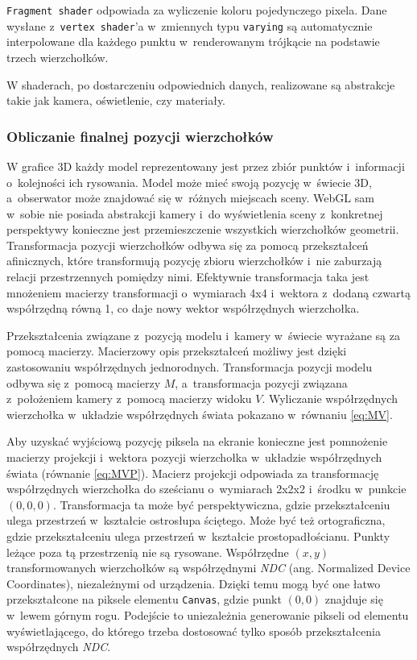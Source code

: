 \texttt{Fragment shader} odpowiada za wyliczenie koloru pojedynczego pixela. Dane wysłane z~\texttt{vertex shader}'a w~zmiennych typu \texttt{varying} są automatycznie interpolowane dla każdego punktu w~renderowanym trójkącie na podstawie trzech wierzchołków.

W shaderach, po dostarczeniu odpowiednich danych, realizowane są abstrakcje takie jak kamera, oświetlenie, czy materiały.

\subsubsection{Obliczanie finalnej pozycji wierzchołków}

W grafice 3D każdy model reprezentowany jest przez zbiór punktów i~informacji o~kolejności ich rysowania. Model może mieć swoją pozycję w~świecie 3D, a~obserwator może znajdować się w~różnych miejscach sceny. WebGL sam w~sobie nie posiada abstrakcji kamery i~do wyświetlenia sceny z~konkretnej perspektywy konieczne jest przemieszczenie wszystkich wierzchołków geometrii. Transformacja pozycji wierzchołków odbywa się za pomocą przekształceń afinicznych, które transformują pozycję zbioru wierzchołków i~nie zaburzają relacji przestrzennych pomiędzy nimi. Efektywnie transformacja taka jest mnożeniem macierzy transformacji o~wymiarach 4x4 i~wektora z~dodaną czwartą współrzędną równą 1, co daje nowy wektor współrzędnych wierzchołka.

Przekształcenia związane z~pozycją modelu i~kamery w~świecie wyrażane są za pomocą macierzy. Macierzowy opis przekształceń możliwy jest dzięki zastosowaniu współrzędnych jednorodnych\cite{Homogeneous}. Transformacja pozycji modelu odbywa się z~pomocą macierzy $M$, a~transformacja pozycji związana z~położeniem kamery z~pomocą macierzy widoku $V$. Wyliczanie współrzędnych wierzchołka w~układzie współrzędnych świata pokazano w~równaniu \ref{eq:MV}.

Aby uzyskać wyjściową pozycję piksela na ekranie konieczne jest pomnożenie macierzy projekcji i~wektora pozycji wierzchołka w~układzie współrzędnych świata (równanie \ref{eq:MVP}). Macierz projekcji odpowiada za transformację współrzędnych wierzchołka do sześcianu o~wymiarach 2x2x2 i~środku w~punkcie $(0, 0, 0)$. Transformacja ta może być perspektywiczna, gdzie przekształceniu ulega przestrzeń w~kształcie ostrosłupa ściętego. Może być też ortograficzna, gdzie przekształceniu ulega przestrzeń w~kształcie prostopadłościanu. Punkty leżące poza tą przestrzenią nie są rysowane. Współrzędne $(x, y)$ transformowanych wierzchołków są współrzędnymi \textit{NDC} (ang. Normalized Device Coordinates), niezależnymi od urządzenia. Dzięki temu mogą być one łatwo przekształcone na piksele elementu \texttt{Canvas}, gdzie punkt $(0, 0)$ znajduje się w~lewem górnym rogu. Podejście to uniezależnia generowanie pikseli od elementu wyświetlającego, do którego trzeba dostosować tylko sposób przekształcenia współrzędnych \textit{NDC}.

